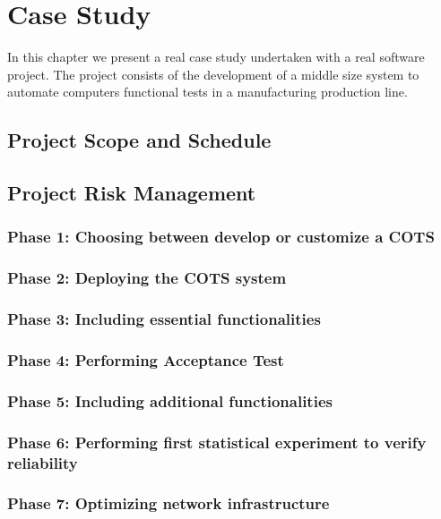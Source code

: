 \chapter{Case Study}\label{cap:casestudy}

In this chapter we present a real case study undertaken with a real software project. The project consists of the development of a middle size system to automate computers functional tests in a manufacturing production line.

\section{Project Scope and Schedule}

\section{Project Risk Management}

\subsection{Phase 1: Choosing between develop or customize a COTS}

\subsection{Phase 2: Deploying the COTS system}

\subsection{Phase 3: Including essential functionalities }

\subsection{Phase 4: Performing Acceptance Test}

\subsection{Phase 5: Including additional functionalities}

\subsection{Phase 6: Performing first statistical experiment to verify reliability}

\subsection{Phase 7: Optimizing network infrastructure}

